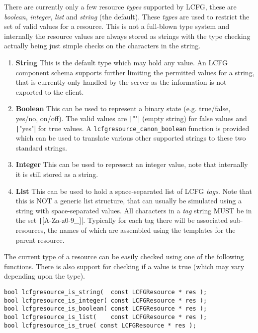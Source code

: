 \documentclass[11pt,a4paper,titlepage]{article}
\begin{document}
There are currently only a few resource \textit{types} supported by
LCFG, these are \textit{boolean}, \textit{integer}, \textit{list} and
\textit{string} (the default). These \textit{types} are used to
restrict the set of valid values for a resource. This is not a
full-blown type system and internally the resource values are always
stored as strings with the type checking actually being just simple
checks on the characters in the string.

\begin{enumerate}

\item \textbf{String} This is the default type which may hold any
  value. An LCFG component schema supports further limiting the
  permitted values for a string, that is currently only handled by
  the server as the information is not exported to the client.

\item \textbf{Boolean} This can be used to represent a binary state
  (e.g. true/false, yes/no, on/off). The valid values are \texttt|""|
  (empty string) for false values and \texttt|"yes"| for true values. A
  \texttt{lcfgresource\_canon\_boolean} function is provided which can
  be used to translate various other supported strings to these two
  standard strings.

\item \textbf{Integer} This can be used to represent an integer value,
  note that internally it is still stored as a string.

\item \textbf{List} This can be used to hold a space-separated list of
  LCFG \textit{tags}. Note that this is NOT a generic list structure,
  that can usually be simulated using a string with space-separated
  values. All characters in a \textit{tag} string MUST be in the set
  \texttt|[A-Za-z0-9_]|. Typically for each tag there will be associated
  sub-resources, the names of which are assembled using the templates
  for the parent resource.

\end{enumerate}

The current type of a resource can be easily checked using one of the
following functions. There is also support for checking if a value is
true (which may vary depending upon the type).

\begin{verbatim}
bool lcfgresource_is_string(  const LCFGResource * res );
bool lcfgresource_is_integer( const LCFGResource * res );
bool lcfgresource_is_boolean( const LCFGResource * res );
bool lcfgresource_is_list(    const LCFGResource * res );
bool lcfgresource_is_true( const LCFGResource * res );
\end{verbatim}
\end{document}

